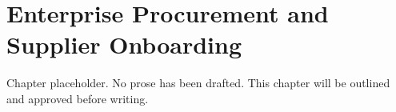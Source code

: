 \chapter{Enterprise Procurement and Supplier Onboarding}
\begin{notebox}
Chapter placeholder. No prose has been drafted. This chapter will be outlined and approved before writing.
\end{notebox}
